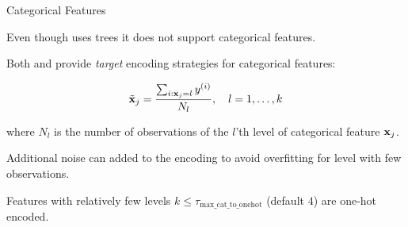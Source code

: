 \documentclass[11pt,compress,t,notes=noshow, xcolor=table]{beamer}
\begin{document}
\begin{vbframe}{Categorical Features}

Even though  uses trees it does not support categorical features.

\lz

Both  and  provide \emph{target} encoding strategies for categorical features:

$$
  \tilde {\mathbf{x}}_j = \frac{\sum_{i:\mathbf{x}_j=l}y^{(i)}}{N_l}, \quad l=1,\dots,k
$$

where $N_l$ is the number of observations of the $l$'th level of categorical feature $\mathbf{x}_j$.

\lz

Additional noise can added to the encoding to avoid overfitting for level with few observations.

\lz

Features with relatively few levels $k \le \tau_\text{max\_cat\_to\_onehot}$ (default $4$) are one-hot encoded.

\end{vbframe}
\end{document}
